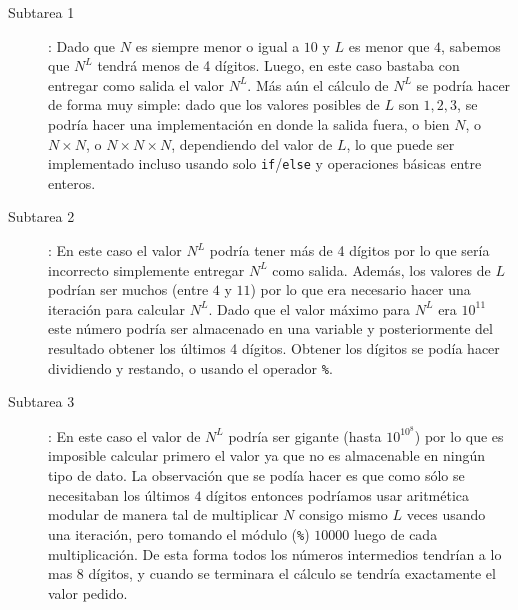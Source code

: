 \begin{description}
\item[Subtarea 1]: Dado que $N$ es siempre menor o igual
a $10$ y $L$ es menor que $4$, sabemos que $N^L$ tendrá menos de 4 dígitos.
Luego, en este caso bastaba con entregar como salida el valor $N^L$.
Más aún el cálculo de $N^L$ se podría hacer de forma muy simple: 
dado que los valores posibles de $L$ son $1,2,3$, 
se podría hacer una implementación en donde la salida fuera, 
o bien $N$, o $N\times N$, o $N\times N\times N$, dependiendo del valor de $L$,
lo que puede ser implementado incluso usando solo \texttt{if}/\texttt{else} y 
operaciones básicas entre enteros.

\item[Subtarea 2]: En este caso el valor $N^L$ podría tener más de 4 dígitos por 
lo que sería incorrecto simplemente entregar $N^L$ como salida.
Además, los valores de $L$ podrían ser muchos (entre $4$ y $11$)
por lo que era necesario hacer una iteración para calcular $N^L$.
Dado que el valor máximo para $N^L$ era $10^{11}$ este número podría ser
almacenado en una variable y posteriormente del resultado obtener los últimos 4 dígitos.
Obtener los dígitos se podía hacer dividiendo y restando, o usando el 
operador \texttt{\%}.

\item[Subtarea 3]: En este caso el valor de $N^L$ podría ser gigante (hasta $10^{10^8}$)
por lo que es imposible calcular primero el valor ya que no es almacenable en ningún tipo
de dato.
La observación que se podía hacer es que como sólo se necesitaban los últimos $4$ dígitos
entonces podríamos usar aritmética modular de manera tal de multiplicar $N$ consigo mismo
$L$ veces usando una iteración, pero tomando el módulo (\texttt{\%}) $10000$ luego de cada multiplicación. De esta
forma todos los números intermedios tendrían a lo mas $8$ dígitos, y cuando se terminara
el cálculo se tendría exactamente el valor pedido.



\end{description}
